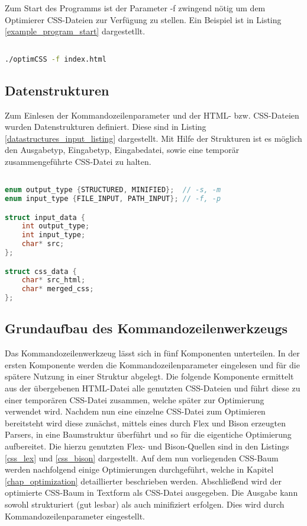 Zum Start des Programms ist der Parameter -f zwingend nötig um dem Optimierer CSS-Dateien zur Verfügung zu stellen. Ein Beispiel ist in Listing \ref{example_program_start} dargestetllt.

\begin{lstlisting}[label=example_program_start,language=Bash, caption=Programmstart]

./optimCSS -f index.html

\end{lstlisting}

\subsection{Datenstrukturen}

Zum Einlesen der Kommandozeilenparameter und der HTML- bzw. CSS-Dateien wurden Datenstrukturen definiert. Diese sind in Listing \ref{datastructures_input_listing} dargestellt.
Mit Hilfe der Strukturen ist es möglich den Ausgabetyp, Eingabetyp, Eingabedatei, sowie eine temporär zusammengeführte CSS-Datei zu halten.

\begin{lstlisting}[label=datastructures_input_listing,language=C, caption=Datenstrukturen]

enum output_type {STRUCTURED, MINIFIED};  // -s, -m
enum input_type {FILE_INPUT, PATH_INPUT}; // -f, -p

struct input_data {
	int output_type;
	int input_type;
	char* src;
};

struct css_data {
	char* src_html;
	char* merged_css;
};

\end{lstlisting}


\subsection{Grundaufbau des Kommandozeilenwerkzeugs}
Das Kommandozeilenwerkzeug lässt sich in fünf Komponenten unterteilen. In der ersten Komponente werden die Kommandozeilenparameter eingelesen und für die spätere Nutzung in einer Struktur abgelegt.
Die folgende Komponente ermittelt aus der übergebenen HTML-Datei alle genutzten CSS-Dateien und führt diese zu einer temporären CSS-Datei zusammen, welche später zur Optimierung verwendet wird.
Nachdem nun eine einzelne CSS-Datei zum Optimieren bereitsteht wird diese zunächst, mittels eines durch Flex und Bison erzeugten Parsers, in eine Baumstruktur überführt und so für die eigentiche Optimierung aufbereitet.
Die hierzu genutzten Flex- und Bison-Quellen sind in den Listings \ref{css_lex} und \ref{css_bison} dargestellt. 
Auf dem nun vorliegenden CSS-Baum werden nachfolgend einige Optimierungen durchgeführt, welche in Kapitel \ref{chap_optimization} detaillierter beschrieben werden.
Abschließend wird der optimierte CSS-Baum in Textform als CSS-Datei ausgegeben. Die Ausgabe kann sowohl strukturiert (gut lesbar) als auch minifiziert erfolgen. Dies wird durch Kommandozeilenparameter eingestellt.



